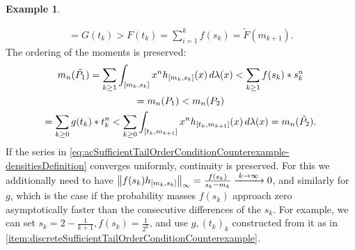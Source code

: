 \documentclass[a4paper]{scrreprt}
\theoremstyle{definition}
\newtheorem{ex}[thm]{Example} %
\begin{document}
\begin{ex}
\begin{enumerate}
\begin{gather*}
                = G(t_k)
                > F(t_k)
                = \sum_{i=1}^{k} f(s_k) 
                = \tilde{F}(m_{k+1}).
            \end{gather*}
            The ordering of the moments is preserved:
            \begin{multline*}
                m_n(\tilde{P_1})
                = \sum_{k \geq 1} \int_{[m_k, s_k]} x^n h_{[m_k, s_k]}(x) \, d\lambda(x)
                < \sum_{k \geq 1} f(s_k)*s_k^n \\
                = m_n(P_1)
                < m_n(P_2) \\
                = \sum_{k \geq 0} g(t_k)*t_k^n
                < \sum_{k \geq 0} \int_{[t_k, m_{k+1}]} x^n h_{[t_k, m_{k+1}]}(x) \, d\lambda(x)
                = m_n(\tilde{P_2}).
            \end{multline*}
            If the series in \eqref{eq:acSufficientTailOrderConditionCounterexample-densitiesDefinition} converges uniformly, continuity is preserved.
            For this we additionally need to have $\left\lVert f(s_k) h_{[m_k, s_k]}\right\rVert_\infty = \frac{f(s_k)}{s_k - m_k} \xrightarrow{\;k \to \infty\;} 0$, and similarly for $g$, which is the case if the probability masses $f(s_k)$ approach zero asymptotically faster than the consecutive differences of the $s_k$. For example, we can set $s_k = 2-\frac{1}{k+1}, f(s_k) = \frac{1}{2^k}$, and use $g, (t_k)_k$ constructed from it as in \ref{item:discreteSufficientTailOrderConditionCounterexample}.
        \end{enumerate}
    \end{ex}
    
\end{document}

